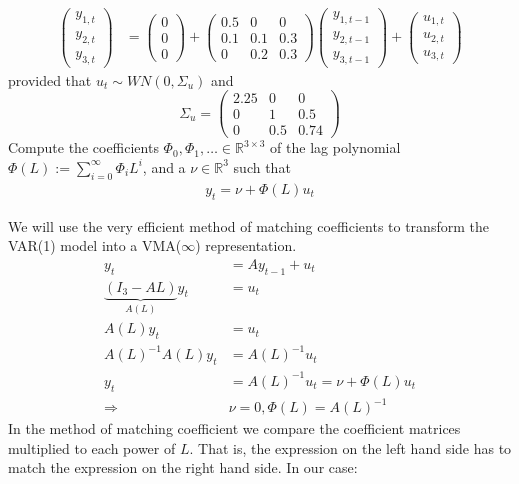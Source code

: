 \documentclass[a4paper]{scrartcl}
\begin{document}
\begin{enumerate}
\begin{align*}
\begin{pmatrix}y_{1,t} \\ y_{2,t}\\y_{3,t} \end{pmatrix} &= \begin{pmatrix}0\\0\\0 \end{pmatrix} + \begin{pmatrix}0.5 &0 &0 \\0.1&0.1&0.3\\0&0.2&0.3 \end{pmatrix} \begin{pmatrix}y_{1,{t-1}} \\ y_{2,{t-1}}\\y_{3,{t-1}} \end{pmatrix} + \begin{pmatrix}u_{1,t} \\ u_{2,t}\\ u_{3,t} \end{pmatrix}
\end{align*}
provided that $u_t \sim WN(0,\Sigma_u)$ and $$\Sigma_u = \begin{pmatrix}2.25 & 0 & 0\\ 0 & 1 & 0.5\\ 0 & 0.5 & 0.74 \end{pmatrix}$$
Compute the coefficients $\Phi_0, \Phi_1, \dots \in \mathbb{R}^{3\times 3}$ of the lag polynomial $\Phi(L) := \sum_{i=0}^\infty \Phi_i L^i$, and a $\nu \in \mathbb{R}^3$ such that
\begin{align*}
y_t = \nu + \Phi(L) u_t
\end{align*}
\begin{solution}
		We will use the very efficient method of matching coefficients to transform the VAR(1) model into a VMA($\infty$) representation.
		\begin{align*}
		y_t &= A y_{t-1} + u_t\\
		\underbrace{(I_3 - A L)}_{A(L)} y_t &= u_t\\
		A(L) y_t &= u_t \\
		A(L)^{-1}A(L) y_t &= A(L)^{-1} u_t\\
		y_t &= A(L)^{-1} u_t = \nu + \Phi(L) u_t\\
		\Rightarrow & \nu= 0, \Phi(L) = A(L)^{-1}
		\end{align*}
		In the method of matching coefficient we compare the coefficient matrices multiplied to each power of $L$. That is, the expression on the left hand side has to match the expression on the right hand side. In our case:

\end{solution}
\end{enumerate}
\end{document}
